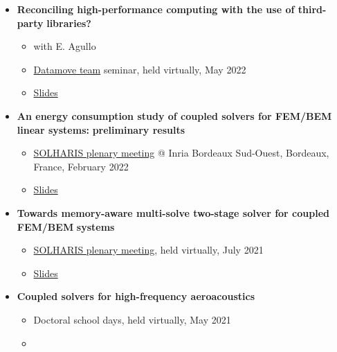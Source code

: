 \documentclass[a4paper, 11pt]{article}
\begin{document}
\begin{itemize}
\begin{itemize}
\end{itemize}
\item \textbf{Reconciling high-performance computing with the use of third-party}
\textbf{libraries?}
\begin{itemize}
\item with E. Agullo
\item \href{https://team.inria.fr/datamove/}{Datamove team} seminar, held virtually,
May 2022
\item \begin{center}
\end{center}
\href{https://thesis-mfelsoci.gitlabpages.inria.fr/slides/datamove/datamove.pdf}{Slides}
\end{itemize}
\item \textbf{An energy consumption study of coupled solvers for FEM/BEM linear systems:}
\textbf{preliminary results}
\begin{itemize}
\item \href{https://www.irit.fr/solharis/solharis-plenary-meeting-09-10-02-2022/}{SOLHARIS
plenary meeting} @ Inria Bordeaux Sud-Ouest, Bordeaux, France, February
2022
\item \begin{center}
\end{center}
\href{https://www.irit.fr/solharis/wp-content/uploads/2022/02/022022\_marek\_felsoci.pdf}{Slides}
\end{itemize}
\item \textbf{Towards memory-aware multi-solve two-stage solver for coupled FEM/BEM}
\textbf{systems}
\begin{itemize}
\item \href{https://www.irit.fr/solharis/solharis-plenary-meeting-02-07-2021/}{SOLHARIS
plenary meeting}, held virtually, July 2021
\item \begin{center}
\end{center}
\href{https://www.irit.fr/solharis/wp-content/uploads/2021/07/072021\_felsoci.pdf}{Slides}
\end{itemize}
\item \textbf{Coupled solvers for high-frequency aeroacoustics}
\begin{itemize}
\item Doctoral school days, held virtually, May 2021
\item \begin{center}

\end{center}
\end{itemize}
\end{itemize}
\end{document}
